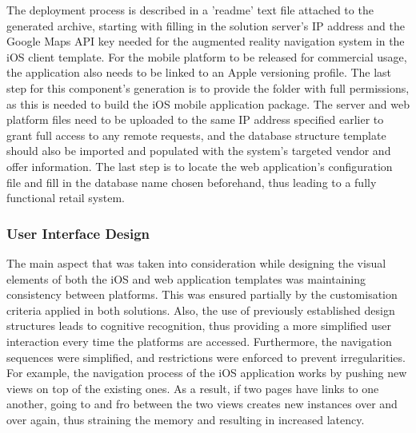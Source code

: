 The deployment process is described in a 'readme' text file attached to the generated archive, starting with filling in the solution server's IP address and the Google Maps API key needed for the augmented reality navigation system in the iOS client template. For the mobile platform to be released for commercial usage, the application also needs to be linked to an Apple versioning profile. The last step for this component's generation is to provide the folder with full permissions, as this is needed to build the iOS mobile application package. The server and web platform files need to be uploaded to the same IP address specified earlier to grant full access to any remote requests, and the database structure template should also be imported and populated with the system's targeted vendor and offer information. The last step is to locate the web application's configuration file and fill in the database name chosen beforehand, thus leading to a fully functional retail system.\\

\subsubsection{User Interface Design}

The main aspect that was taken into consideration while designing the visual elements of both the iOS and web application templates was maintaining consistency between platforms. This was ensured partially by the customisation criteria applied in both solutions. Also, the use of previously established design structures leads to cognitive recognition, thus providing a more simplified user interaction every time the platforms are accessed. Furthermore, the navigation sequences were simplified, and restrictions were enforced to prevent irregularities. For example, the navigation process of the iOS application works by pushing new views on top of the existing ones. As a result, if two pages have links to one another, going to and fro between the two views creates new instances over and over again, thus straining the memory and resulting in increased latency.\\

